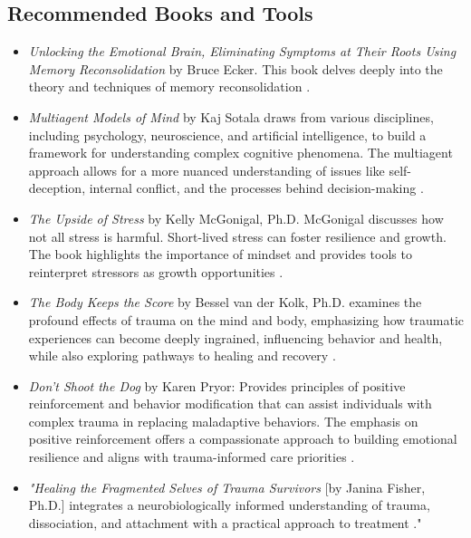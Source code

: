 \documentclass[12pt,letterpaper]{article}
\begin{document}
\subsection{Recommended Books and Tools}
\label{resources}
\begin{itemize}
    \item \textit{Unlocking the Emotional Brain, Eliminating Symptoms at Their Roots Using Memory Reconsolidation} by Bruce Ecker. This book delves deeply into the theory and techniques of memory reconsolidation \cite{eckerUnlocking}.
    \item \textit{Multiagent Models of Mind} by Kaj Sotala draws from various disciplines, including psychology, neuroscience, and artificial intelligence, to build a framework for understanding complex cognitive phenomena. The multiagent approach allows for a more nuanced understanding of issues like self-deception, internal conflict, and the processes behind decision-making \cite{sotalaMultiagent}.
    \item \textit{The Upside of Stress} by Kelly McGonigal, Ph.D. McGonigal discusses how not all stress is harmful. Short-lived stress can foster resilience and growth. The book highlights the importance of mindset and provides tools to reinterpret stressors as growth opportunities \cite{mcgonigalStress}.
    \item \textit{The Body Keeps the Score} by Bessel van der Kolk, Ph.D. examines the profound effects of trauma on the mind and body, emphasizing how traumatic experiences can become deeply ingrained, influencing behavior and health, while also exploring pathways to healing and recovery \cite{vanderKolkBody}.
    \item \textit{Don't Shoot the Dog} by Karen Pryor: Provides principles of positive reinforcement and behavior modification that can assist individuals with complex trauma in replacing maladaptive behaviors. The emphasis on positive reinforcement offers a compassionate approach to building emotional resilience and aligns with trauma-informed care priorities \cite{pryorDog}.
    \item \textit{"Healing the Fragmented Selves of Trauma Survivors} [by Janina Fisher, Ph.D.] integrates a neurobiologically informed understanding of trauma, dissociation, and attachment with a practical approach to treatment \cite{fisherFragmented}."

\end{itemize}
\end{document}
